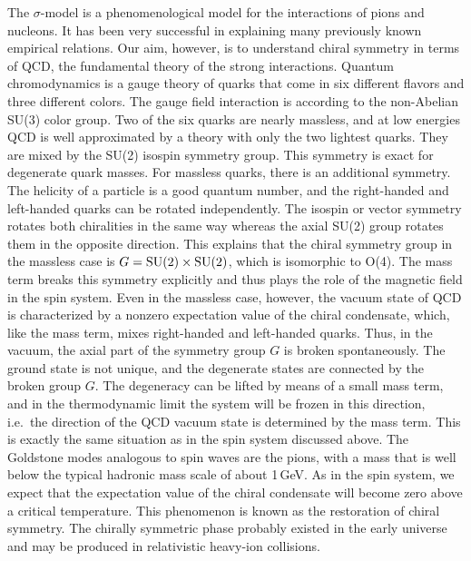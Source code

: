 The $\sigma$-model is a phenomenological model for the interactions of
pions and nucleons.  It has been very successful in explaining many
previously known empirical relations.  Our aim, however, is to
understand chiral symmetry in terms of QCD, the fundamental theory of
the strong interactions.  Quantum chromodynamics is a gauge theory of quarks
that come in six different flavors and three different colors. The
gauge field interaction is according to the non-Abelian SU(3) color
group.  Two of the six quarks are nearly massless, and at low energies
QCD is well approximated by a theory with only the two lightest
quarks. They are mixed by the SU(2) isospin symmetry group.  This
symmetry is exact for degenerate quark masses.  For massless quarks,
there is an additional symmetry.  The helicity of a particle is a good
quantum number, and the right-handed and left-handed quarks can be
rotated independently.  The isospin or vector symmetry rotates both
chiralities in the same way whereas the axial SU(2) group rotates them
in the opposite direction.  This explains that the chiral symmetry group in
the massless case is $G=\rm SU(2)\times SU(2)$, which is isomorphic to
O(4).  The mass term breaks this symmetry explicitly and thus plays
the role of the magnetic field in the spin system.  Even in the
massless case, however, the vacuum state of QCD is characterized by a
nonzero expectation value of the chiral condensate, which, like the
mass term, mixes right-handed and left-handed quarks.  Thus, in the
vacuum, the axial part of the symmetry group $G$ is broken
spontaneously.  The ground state is not unique, and the degenerate
states are connected by the broken group $G$.  The degeneracy can be
lifted by means of a small mass term, and in the thermodynamic limit
the system will be frozen in this direction, i.e.\ the direction of
the QCD vacuum state is determined by the mass term.  This is exactly
the same situation as in the spin system discussed above.  The
Goldstone modes analogous to spin waves are the pions, with a mass that
is well below the typical hadronic mass scale of about 1\,GeV.  As in
the spin system, we expect that the expectation value of the chiral
condensate will become zero above a critical temperature.  This
phenomenon is known as the restoration of chiral symmetry. The
chirally symmetric phase probably existed in the early universe and
may be produced in relativistic heavy-ion collisions.

